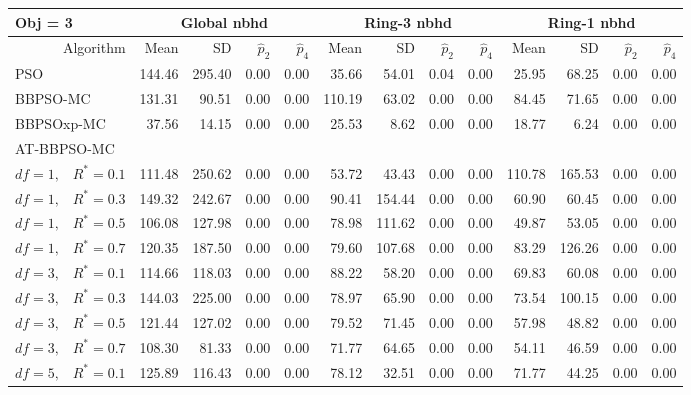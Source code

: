 \documentclass[12pt]{article}
\begin{document}
\begin{appendix}
\begin{table}[ht]
\centering
\footnotesize{
\begin{tabular}{r|rrrr|rrrr|rrrr}
\multicolumn{1}{l}{Obj = 3} & \multicolumn{4}{c}{Global nbhd} & \multicolumn{4}{c}{Ring-3 nbhd} & \multicolumn{4}{c}{Ring-1 nbhd}\\
  \hline
Algorithm & Mean & SD & $\widehat{p}_2$ & $\widehat{p}_4$ & Mean & SD & $\widehat{p}_2$ & $\widehat{p}_4$ & Mean & SD & $\widehat{p}_2$ & $\widehat{p}_4$ \\ 
  \hline
\multicolumn{1}{l|}{PSO} & 144.46 & 295.40 & 0.00 & 0.00 & 35.66 & 54.01 & 0.04 & 0.00 & 25.95 & 68.25 & 0.00 & 0.00 \\ 
  \multicolumn{1}{l|}{BBPSO-MC} & 131.31 & 90.51 & 0.00 & 0.00 & 110.19 & 63.02 & 0.00 & 0.00 & 84.45 & 71.65 & 0.00 & 0.00 \\ 
  \multicolumn{1}{l|}{BBPSOxp-MC} & 37.56 & 14.15 & 0.00 & 0.00 & 25.53 & 8.62 & 0.00 & 0.00 & 18.77 & 6.24 & 0.00 & 0.00 \\ 
\hline
\multicolumn{1}{l|}{AT-BBPSO-MC} &&&&&&&&&&&&\\
  $df = 1,\enspace$ $R^* =0.1$ & 111.48 & 250.62 & 0.00 & 0.00 & 53.72 & 43.43 & 0.00 & 0.00 & 110.78 & 165.53 & 0.00 & 0.00 \\ 
  $df = 1,\enspace$ $R^* =0.3$ & 149.32 & 242.67 & 0.00 & 0.00 & 90.41 & 154.44 & 0.00 & 0.00 & 60.90 & 60.45 & 0.00 & 0.00 \\ 
  $df = 1,\enspace$ $R^* =0.5$ & 106.08 & 127.98 & 0.00 & 0.00 & 78.98 & 111.62 & 0.00 & 0.00 & 49.87 & 53.05 & 0.00 & 0.00 \\ 
  $df = 1,\enspace$ $R^* =0.7$ & 120.35 & 187.50 & 0.00 & 0.00 & 79.60 & 107.68 & 0.00 & 0.00 & 83.29 & 126.26 & 0.00 & 0.00 \\ 
  $df = 3,\enspace$ $R^* =0.1$ & 114.66 & 118.03 & 0.00 & 0.00 & 88.22 & 58.20 & 0.00 & 0.00 & 69.83 & 60.08 & 0.00 & 0.00 \\ 
  $df = 3,\enspace$ $R^* =0.3$ & 144.03 & 225.00 & 0.00 & 0.00 & 78.97 & 65.90 & 0.00 & 0.00 & 73.54 & 100.15 & 0.00 & 0.00 \\ 
  $df = 3,\enspace$ $R^* =0.5$ & 121.44 & 127.02 & 0.00 & 0.00 & 79.52 & 71.45 & 0.00 & 0.00 & 57.98 & 48.82 & 0.00 & 0.00 \\ 
  $df = 3,\enspace$ $R^* =0.7$ & 108.30 & 81.33 & 0.00 & 0.00 & 71.77 & 64.65 & 0.00 & 0.00 & 54.11 & 46.59 & 0.00 & 0.00 \\ 
  $df = 5,\enspace$ $R^* =0.1$ & 125.89 & 116.43 & 0.00 & 0.00 & 78.12 & 32.51 & 0.00 & 0.00 & 71.77 & 44.25 & 0.00 & 0.00 \\ 

\end{tabular}}
\end{table}
\end{appendix}
\end{document}
